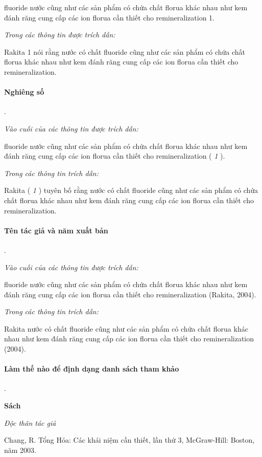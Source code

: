 \documentclass{hcmutarticle}
\begin{document}
fluoride nước cũng như các sản phẩm có chứa chất florua khác nhau như kem đánh răng cung cấp các ion florua cần thiết cho remineralization 1.

{\em Trong các thông tin được trích dẫn:}

Rakita 1 nói rằng nước có chất fluoride cũng như các sản phẩm có chứa chất florua khác nhau như kem đánh răng cung cấp các ion florua cần thiết cho remineralization.


\paragraph{Nghiêng số}.

{\em Vào cuối của các thông tin được trích dẫn:}

fluoride nước cũng như các sản phẩm có chứa chất florua khác nhau như kem đánh răng cung cấp các ion florua cần thiết cho remineralization ( {\itshape 1} ).

{\em Trong các thông tin trích dẫn:}

Rakita ( {\itshape 1} ) tuyên bố rằng nước có chất fluoride cũng như các sản phẩm có chứa chất florua khác nhau như kem đánh răng cung cấp các ion florua cần thiết cho remineralization.


\paragraph{Tên tác giả và năm xuất bản}.

{\em Vào cuối của các thông tin được trích dẫn:}

fluoride nước cũng như các sản phẩm có chứa chất florua khác nhau như kem đánh răng cung cấp các ion florua cần thiết cho remineralization (Rakita, 2004).

{\em Trong các thông tin trích dẫn:}

Rakita nước có chất fluoride cũng như các sản phẩm có chứa chất florua khác nhau như kem đánh răng cung cấp các ion florua cần thiết cho remineralization (2004).

\paragraph{Làm thế nào để định dạng danh sách tham khảo}.

{\bfseries Sách}

{\em Độc thân tác giả}

Chang, R. Tổng Hóa: Các khái niệm cần thiết, lần thứ 3, McGraw-Hill: Boston, năm 2003.
\end{document}
